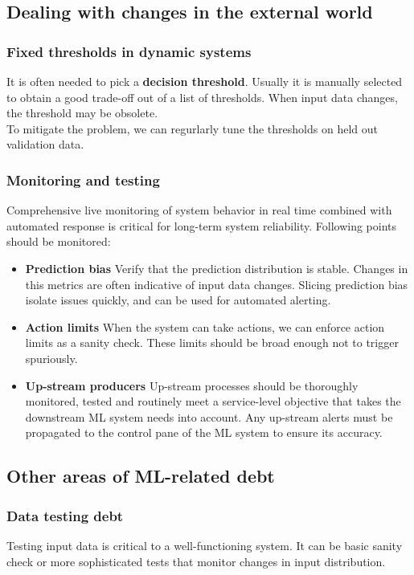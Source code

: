 \documentclass[../main.tex]{subfiles}
\begin{document}
\subsection{Dealing with changes in the external world}
\subsubsection{Fixed thresholds in dynamic systems}
It is often needed to pick a \textbf{decision threshold}. Usually it is manually selected to
obtain a good trade-off out of a list of thresholds. When input data changes, the threshold may be
obsolete.\\
To mitigate the problem, we can regurlarly tune the thresholds on held out validation data.

\subsubsection{Monitoring and testing}
Comprehensive live monitoring of system behavior in real time combined with automated response
is critical for long-term system reliability.
Following points should be monitored:
\begin{itemize}
    \item \textbf{Prediction bias} Verify that the prediction distribution is stable. Changes in this
        metrics are often indicative of input data changes. Slicing prediction bias isolate issues quickly,
        and can be used for automated alerting.
    \item \textbf{Action limits} When the system can take actions, we can enforce action limits as a sanity
        check. These limits should be broad enough not to trigger spuriously.
    \item \textbf{Up-stream producers} Up-stream processes should be thoroughly monitored, tested and
        routinely meet a service-level objective that takes the downstream ML system needs into account.
        Any up-stream alerts must be propagated to the control pane of the ML system to ensure its
        accuracy.
\end{itemize}

\subsection{Other areas of ML-related debt}
\subsubsection{Data testing debt}
Testing input data is critical to a well-functioning system. It can be basic sanity check or more
sophisticated tests that monitor changes in input distribution.
\end{document}
